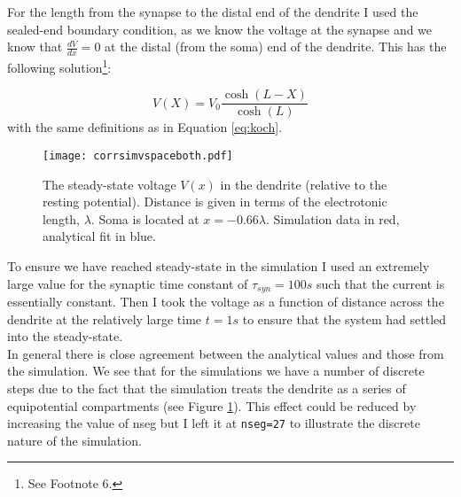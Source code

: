 \documentclass[paper=a4, fontsize=11pt]{scrartcl} %
\numberwithin{equation}{section} %
\numberwithin{figure}{section} %
\numberwithin{table}{section} %
\begin{document}
For the length from the synapse to the distal end of the dendrite I used the sealed-end boundary condition, as we know the voltage at the synapse and we know that $\frac{dV}{dx}=0$ at the distal (from the soma) end of the dendrite. This has the following solution\footnote{See Footnote 6.}:

\begin{equation}
V(X)= V_0\frac{\cosh(L-X)}{\cosh (L)}
\label{eq:koch2}
\end{equation}
with the same definitions as in Equation \ref{eq:koch}.\\





\begin{figure}[!h]
\centering
\texttt{[image: corrsimvspaceboth.pdf]}
  \caption{The steady-state voltage $V(x)$ in the dendrite (relative to the resting potential). Distance is given in terms of the electrotonic length, $\lambda$. Soma is located at $x=-0.66\lambda$. Simulation data in red, analytical fit in blue.}
  \label{fig:simvspaceboth}
\end{figure}


To ensure we have reached steady-state in the simulation I used an extremely large value for the synaptic time constant of $\tau_{syn}=100s$ such that the current is essentially constant. Then I took the voltage as a function of distance across the dendrite at the relatively large time $t=1s$ to ensure that the system had settled into the steady-state.\\

In general there is close agreement between the analytical values and those from the simulation. We see that for the simulations we have a number of discrete steps due to the fact that the simulation treats the dendrite as a series of equipotential compartments (see Figure \ref{fig:simvspaceboth}). This effect could be reduced by increasing the value of nseg but I left it at \texttt{nseg=27} to illustrate the discrete nature of the simulation.\\
\end{document}
